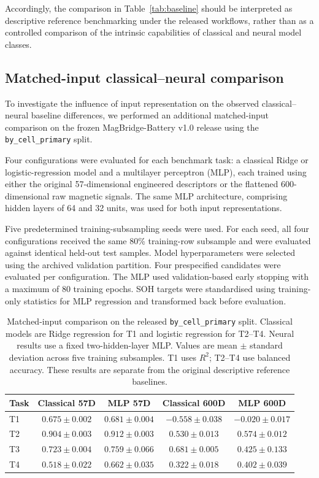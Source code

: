 \documentclass[11pt]{article}
\begin{document}
Accordingly, the comparison in Table~\ref{tab:baseline} should be interpreted as descriptive reference benchmarking under the released workflows, rather than as a controlled comparison of the intrinsic capabilities of classical and neural model classes.

\subsection*{Matched-input classical--neural comparison}

To investigate the influence of input representation on
the observed classical--neural baseline differences,
we performed an additional matched-input comparison
on the frozen MagBridge-Battery v1.0 release using the
\texttt{by\_cell\_primary} split.

Four configurations were evaluated for each benchmark
task: a classical Ridge or logistic-regression model
and a multilayer perceptron (MLP), each trained using
either the original 57-dimensional engineered descriptors
or the flattened 600-dimensional raw magnetic signals.
The same MLP architecture, comprising hidden layers of
64 and 32 units, was used for both input representations.

Five predetermined training-subsampling seeds were used.
For each seed, all four configurations received the
same 80\% training-row subsample and were evaluated
against identical held-out test samples. Model
hyperparameters were selected using the archived
validation partition. Four prespecified candidates
were evaluated per configuration. The MLP used
validation-based early stopping with a maximum of
80 training epochs. SOH targets were standardised
using training-only statistics for MLP regression
and transformed back before evaluation.

\begin{table}[!htbp]
\centering
\caption{Matched-input comparison on the released
\texttt{by\_cell\_primary} split. Classical models are
Ridge regression for T1 and logistic regression for
T2--T4. Neural results use a fixed two-hidden-layer MLP.
Values are mean $\pm$ standard deviation across five
training subsamples. T1 uses $R^2$; T2--T4 use
balanced accuracy. These results are separate from
the original descriptive reference baselines.}
\label{tab:matched_input}
\small
\begin{tabular}{@{}lcccc@{}}
\toprule
Task &
Classical 57D &
MLP 57D &
Classical 600D &
MLP 600D \\
\midrule
T1 &
$0.675\pm0.002$ &
$0.681\pm0.004$ &
$-0.558\pm0.038$ &
$-0.020\pm0.017$ \\

T2 &
$0.904\pm0.003$ &
$0.912\pm0.003$ &
$0.530\pm0.013$ &
$0.574\pm0.012$ \\

T3 &
$0.723\pm0.004$ &
$0.759\pm0.066$ &
$0.681\pm0.005$ &
$0.425\pm0.133$ \\

T4 &
$0.518\pm0.022$ &
$0.662\pm0.035$ &
$0.322\pm0.018$ &
$0.402\pm0.039$ \\
\bottomrule
\end{tabular}
\end{table}
\end{document}
